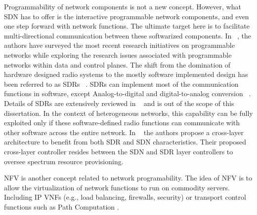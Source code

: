Programmability of network components is not a new concept. However, what \ac{SDN} has to offer is the interactive programmable network components, and even one step forward with network functions. The ultimate target here is to facilitate multi-directional communication between these softwarized components. In ~\cite{Macedo2015}, the authors have surveyed the most recent research initiatives on programmable networks while exploring the research issues associated with programmable networks within data and control planes.
The shift from the domination of hardware designed radio systems to the mostly software implemented design has been referred to as \acp{SDR} ~\cite{267870}. \acp{SDR} can implement most of the communication functions in software, except Analog-to-digital and digital-to-analog conversion ~\cite{Macedo2015}. Details of \acp{SDR} are extensively reviewed in ~\cite{5462981,Macedo2015} and is out of the scope of this dissertation. In the context of heterogeneous networks, this capability can be fully exploited only if these software-defined radio functions can communicate with other software across the entire network. In ~\cite{6895241} the authors propose a cross-layer architecture to benefit from both \ac{SDR} and \ac{SDN} characteristics. Their proposed cross-layer controller resides between the \ac{SDN} and \ac{SDR} layer controllers to oversee spectrum resource provisioning.

\ac{NFV} \cite{nfv_wp} is another concept related to network  programability. The idea of \ac{NFV} is to allow the virtualization of network functions to run on commodity servers. Including \ac{IP} \acp{VNF} (e.g., load balancing, firewalls, security) \cite{Munoz:15} or transport control functions such as Path Computation \cite{7006678}.




